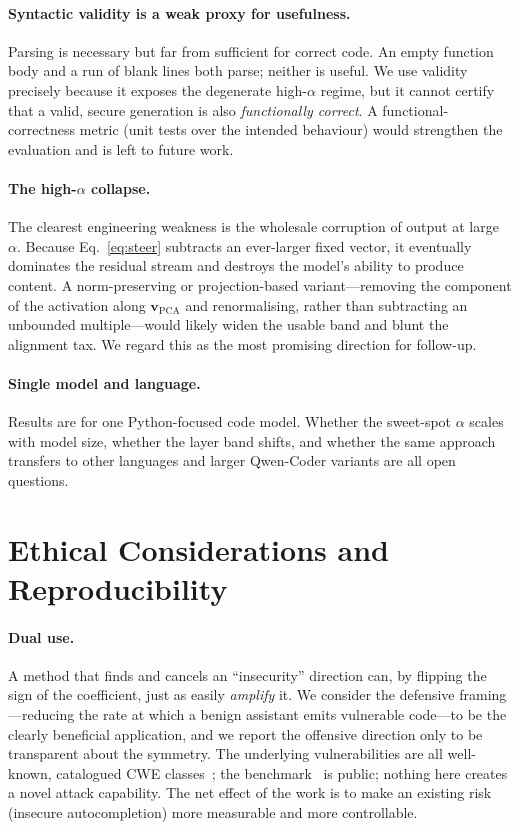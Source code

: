 \documentclass[11pt,a4paper]{article}
\newcommand{\vpca}{\mathbf{v}_{\text{PCA}}}
\begin{document}
\paragraph{Syntactic validity is a weak proxy for usefulness.}
Parsing is necessary but far from sufficient for correct code. An empty function body and a run of blank lines both parse; neither is useful. We use validity precisely because it exposes the degenerate high-$\alpha$ regime, but it cannot certify that a valid, secure generation is also \emph{functionally correct}. A functional-correctness metric (unit tests over the intended behaviour) would strengthen the evaluation and is left to future work.

\paragraph{The high-$\alpha$ collapse.}
The clearest engineering weakness is the wholesale corruption of output at large $\alpha$. Because Eq.~\eqref{eq:steer} subtracts an ever-larger fixed vector, it eventually dominates the residual stream and destroys the model's ability to produce content. A norm-preserving or projection-based variant---removing the component of the activation along $\vpca$ and renormalising, rather than subtracting an unbounded multiple---would likely widen the usable band and blunt the alignment tax. We regard this as the most promising direction for follow-up.

\paragraph{Single model and language.}
Results are for one Python-focused code model. Whether the sweet-spot $\alpha$ scales with model size, whether the layer band shifts, and whether the same approach transfers to other languages and larger Qwen-Coder variants are all open questions.

\section{Ethical Considerations and Reproducibility}
\label{sec:ethics}

\paragraph{Dual use.}
A method that finds and cancels an ``insecurity'' direction can, by flipping the sign of the coefficient, just as easily \emph{amplify} it. We consider the defensive framing---reducing the rate at which a benign assistant emits vulnerable code---to be the clearly beneficial application, and we report the offensive direction only to be transparent about the symmetry. The underlying vulnerabilities are all well-known, catalogued CWE classes~\cite{mitre_cwe}; the benchmark~\cite{siddiq2022securityeval} is public; nothing here creates a novel attack capability. The net effect of the work is to make an existing risk (insecure autocompletion) more measurable and more controllable.
\end{document}
